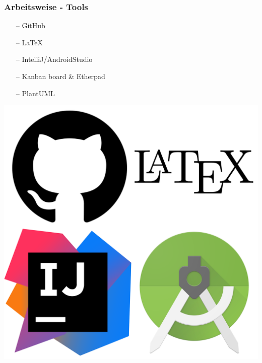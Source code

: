 \documentclass[aspectratio=1610]{beamer}
\begin{document}
  \begin{frame}[plain]
      \frametitle{\textbf{Arbeitsweise - Tools}}
      \begin{minipage}{0.45\textwidth}
        \begin{itemize}
          \item[--] GitHub
          \item[--] LaTeX
          \item[--] IntelliJ/AndroidStudio
          \item[--] Kanban board \& Etherpad
          \item[--] PlantUML
        \end{itemize}
      \end{minipage}
      \begin{minipage}{0.45\textwidth}
        \includegraphics[width = \columnwidth - 30pt]
          {images/tools.png}
      \end{minipage}
  \end{frame}
\end{document}
